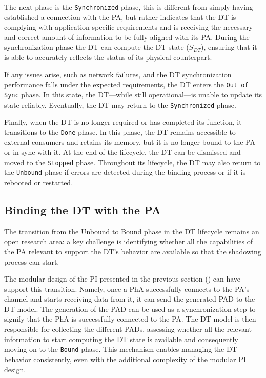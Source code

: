 The next phase is the \texttt{Synchronized} phase, 
this is different from simply having established a connection with the \ac{PA}, 
but rather indicates that the \ac{DT} is complying with application-specific requirements
and is receiving the necessary and correct amount of information to be fully aligned with its \ac{PA}.
%
During the synchronization phase the \ac{DT} can compute the \ac{DT} state ($S_{DT}$), ensuring that it is able to accurately reflects the status of its physical counterpart.

If any issues arise, such as network failures, and the \ac{DT} synchronization performance falls under the expected requirements, the \ac{DT} enters the \texttt{Out of Sync} phase.
In this state, the \ac{DT}---while still operational---is unable to update its state reliably. 
%
Eventually, the \ac{DT} may return to the \texttt{Synchronized} phase.

Finally, when the \ac{DT} is no longer required or has completed its function, it transitions to the \texttt{Done} phase.
In this phase, the \ac{DT} remains accessible to external consumers and retains its memory, but it is no longer bound to the \ac{PA} or in sync with it. At the end of the lifecycle, the \ac{DT} can be dismissed and moved to the \texttt{Stopped} phase.
Throughout its lifecycle, the \ac{DT} may also return to the \texttt{Unbound} phase if errors are detected during the binding process or if it is rebooted or restarted.


\subsection{Binding the DT with the PA}

The transition from the Unbound to Bound phase in the \ac{DT} lifecycle remains an open research area:
a key challenge is identifying whether all the capabilities of the \ac{PA} relevant to support the \ac{DT}'s behavior are available so that the shadowing process can start.

The modular design of the \ac{PI} presented in the previous section () can have support this transition.
%
Namely, once a \ac{PhA} successfully connects to the \ac{PA}'s channel and starts receiving data from it, it can send the generated \ac{PAD} to the \ac{DT} model.
The generation of the \ac{PAD} can be used as a synchronization step to signify that the \ac{PhA} is successfully connected to the \ac{PA}.
%
The \ac{DT} model is then responsible for collecting the different \acp{PAD}, assessing whether all the relevant information to start computing the \ac{DT} state is available and consequently moving on to the \texttt{Bound} phase.
%
This mechanism enables managing the \ac{DT} behavior consistently, even with the additional complexity of the modular \ac{PI} design.

